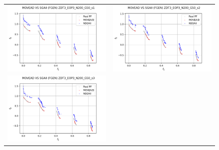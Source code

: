 \begin{figure}[H]
    \centering
    \begin{tabular}{c c}
    \includegraphics[scale=0.5]{figures/ZDT3_EOP3_N200_G50_T30/s1_comp.png} &
    \includegraphics[scale=0.5]{figures/ZDT3_EOP3_N200_G50_T30/s2_comp.png}\\
    \includegraphics[scale=0.5]{figures/ZDT3_EOP3_N200_G50_T30/s3_comp.png} &

\end{tabular}
\end{figure}
